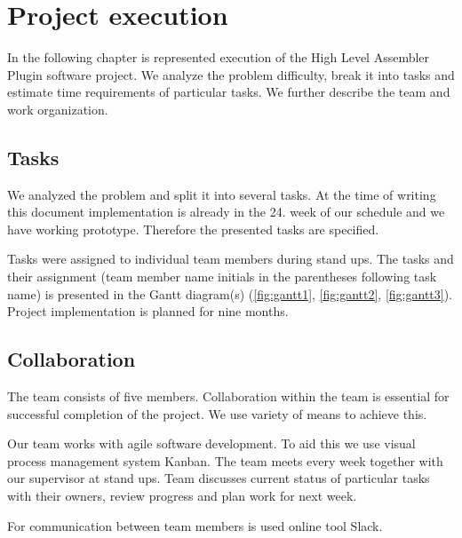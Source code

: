 \chapter{Project execution}

In the following chapter is represented execution of the High Level Assembler Plugin software project. 
We analyze the problem difficulty, break it into tasks and estimate time requirements of particular tasks.
We further describe the team and work organization.

\section{Tasks}
We analyzed the problem and split it into several tasks. At the time of writing this document implementation is already in the 24. week of our schedule and we have working prototype. Therefore the presented tasks are specified. 

Tasks were assigned to individual team members during stand ups. The tasks and their assignment (team member name initials in the parentheses following task name) is presented in the Gantt diagram(s)  (\ref{fig:gantt1}, \ref{fig:gantt2}, \ref{fig:gantt3}). 
Project implementation is planned for nine months. 

\section{Collaboration}
The team consists of five members. Collaboration within the team is essential for successful completion of the project. We use variety of means to achieve this. 

Our team works with agile software development. To aid this we use visual process management system Kanban. The team meets every week together with our supervisor at stand ups. Team discusses current status of particular tasks with their owners, review progress and plan work for next week.

For communication between team members is used online tool Slack.


